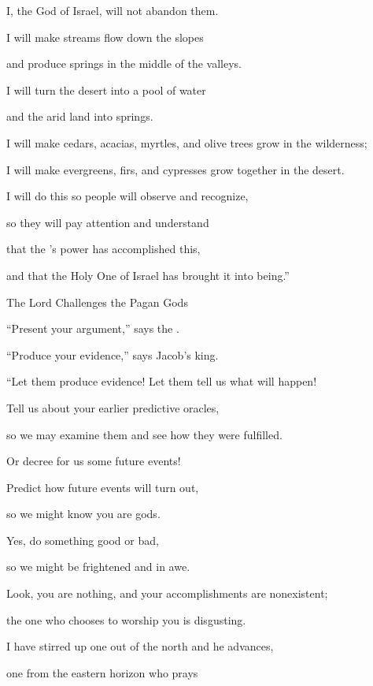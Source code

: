{\par }{\Q I, the God
of Israel,
will not
abandon them.
\par }{\Q {}I will make
streams
flow
down
the slopes
\par }{\Q and produce springs
in the middle
of the valleys.
\par }{\Q I will turn
the desert
into a pool
of water
\par }{\Q and the arid
land
into springs.
\par }{\Q {}I will make
cedars,
acacias,
myrtles,
and olive
trees
grow in the wilderness;
\par }{\Q I will make
evergreens,
firs,
and cypresses
grow together
in the desert.
\par }{\Q {}I
will do this so
people will observe
and recognize,
\par }{\Q so
they will pay attention
and understand
\par }{\Q that
the
{}’s
power
has accomplished
this,
\par }{\Q and that the Holy One
of Israel
has brought it into being.”
\par }{\SH The Lord Challenges the Pagan Gods
\par }{\Q {}“Present
your argument,”
says
the {}.
\par }{\Q “Produce your evidence,”
says
Jacob’s
king.
\par }{\Q {}“Let them produce evidence! Let them tell
us what
will happen!
\par }{\Q Tell us about your earlier
predictive oracles,
\par }{\Q so we may examine
them and see how
they were fulfilled.
\par }{\Q Or
decree
for us some
future
events!
\par }{\Q {}Predict
how future events will turn out,
\par }{\Q so we might know
you
are gods.
\par }{\Q Yes, do something good
or bad,
\par }{\Q so we might be frightened
and in awe.
\par }{\Q {}Look,
you
are nothing,
and your accomplishments
are nonexistent;
\par }{\Q the one who chooses
to worship you is disgusting.
\par }{\Q {}I have stirred up
one out of the north
and he advances,
\par }{\Q one from the eastern
horizon
who prays
}
